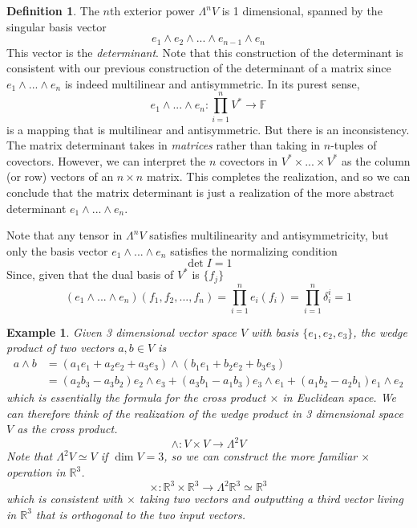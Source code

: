 \documentclass{article}
\newtheorem{example}{Example}[section]
\theoremstyle{remark}
\theoremstyle{definition}
\newtheorem{definition}{Definition}[section]
\begin{document}
\begin{definition}
The $n$th exterior power $\Lambda^n V$ is 1 dimensional, spanned by the singular basis vector 
\[e_1 \wedge e_2 \wedge ... \wedge e_{n-1} \wedge e_n\]
This vector is the \textit{determinant}. Note that this construction of the determinant is consistent with our previous construction of the determinant of a matrix since $e_1 \wedge ... \wedge e_n$ is indeed multilinear and antisymmetric. In its purest sense, 
\[e_1 \wedge ... \wedge e_n: \prod_{i=1}^n V^* \longrightarrow \mathbb{F}\]
is a mapping that is multilinear and antisymmetric. But there is an inconsistency. The matrix determinant takes in \textit{matrices} rather than taking in $n$-tuples of covectors. However, we can interpret the $n$ covectors in $V^* \times ... \times V^*$ as the column (or row) vectors of an $n \times n$ matrix. This completes the realization, and so we can conclude that the matrix determinant is just a realization of the more abstract determinant $e_1 \wedge ... \wedge e_n$. 

Note that any tensor in $\Lambda^n V$ satisfies multilinearity and antisymmetricity, but only the basis vector $e_1 \wedge ... \wedge e_n$ satisfies the normalizing condition
\[\det{I} = 1\]
Since, given that the dual basis of $V^*$ is $\{f_j\}$
\[(e_1 \wedge ... \wedge e_n) (f_1, f_2, ..., f_n) = \prod_{i=1}^n e_i (f_i) = \prod_{i=1}^n \delta_i^i = 1\]
\end{definition}

\begin{example}
Given 3 dimensional vector space $V$ with basis $\{e_1, e_2, e_3\}$, the wedge product of two vectors $a, b \in V$ is 
\begin{align*}
    a \wedge b & = (a_1 e_1 + a_2 e_2 + a_3 e_3) \wedge (b_1 e_1 + b_2 e_2 + b_3 e_3) \\
    & = (a_2 b_3 - a_3 b_2) e_2 \wedge e_3 + (a_3 b_1 - a_1 b_3) e_3 \wedge e_1 + (a_1 b_2 - a_2 b_1) e_1 \wedge e_2 
\end{align*}
which is essentially the formula for the cross product $\times$ in Euclidean space. We can therefore think of the realization of the wedge product in 3 dimensional space $V$ as the cross product. 
\[\wedge: V \times V \longrightarrow \Lambda^2 V\]
Note that $\Lambda^2 V \simeq V$ if $\dim{V} = 3$, so we can construct the more familiar $\times$ operation in $\mathbb{R}^3$. 
\[\times: \mathbb{R}^3 \times \mathbb{R}^3 \longrightarrow \Lambda^2 \mathbb{R}^3 \simeq \mathbb{R}^3\]
which is consistent with $\times$ taking two vectors and outputting a third vector living in $\mathbb{R}^3$ that is orthogonal to the two input vectors. 
\end{example}
\end{document}

